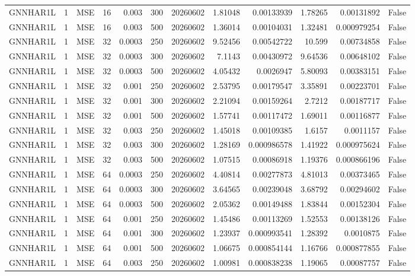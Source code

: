 \begin{tabular}{lrlrrrrrrrrr}
GNNHAR1L & 1 & MSE & 16 & 0.003 & 300 & 20260602 & 1.81048 & 0.00133939 & 1.78265 & 0.00131892 & False \\
GNNHAR1L & 1 & MSE & 16 & 0.003 & 500 & 20260602 & 1.36014 & 0.00104031 & 1.32481 & 0.000979254 & False \\
GNNHAR1L & 1 & MSE & 32 & 0.0003 & 250 & 20260602 & 9.52456 & 0.00542722 & 10.599 & 0.00734858 & False \\
GNNHAR1L & 1 & MSE & 32 & 0.0003 & 300 & 20260602 & 7.1143 & 0.00430972 & 9.64536 & 0.00648102 & False \\
GNNHAR1L & 1 & MSE & 32 & 0.0003 & 500 & 20260602 & 4.05432 & 0.0026947 & 5.80093 & 0.00383151 & False \\
GNNHAR1L & 1 & MSE & 32 & 0.001 & 250 & 20260602 & 2.53795 & 0.00179547 & 3.35891 & 0.00223701 & False \\
GNNHAR1L & 1 & MSE & 32 & 0.001 & 300 & 20260602 & 2.21094 & 0.00159264 & 2.7212 & 0.00187717 & False \\
GNNHAR1L & 1 & MSE & 32 & 0.001 & 500 & 20260602 & 1.57741 & 0.00117472 & 1.69011 & 0.00116877 & False \\
GNNHAR1L & 1 & MSE & 32 & 0.003 & 250 & 20260602 & 1.45018 & 0.00109385 & 1.6157 & 0.0011157 & False \\
GNNHAR1L & 1 & MSE & 32 & 0.003 & 300 & 20260602 & 1.28169 & 0.000986578 & 1.41922 & 0.000975624 & False \\
GNNHAR1L & 1 & MSE & 32 & 0.003 & 500 & 20260602 & 1.07515 & 0.00086918 & 1.19376 & 0.000866196 & False \\
GNNHAR1L & 1 & MSE & 64 & 0.0003 & 250 & 20260602 & 4.40814 & 0.00277873 & 4.81013 & 0.00373465 & False \\
GNNHAR1L & 1 & MSE & 64 & 0.0003 & 300 & 20260602 & 3.64565 & 0.00239048 & 3.68792 & 0.00294602 & False \\
GNNHAR1L & 1 & MSE & 64 & 0.0003 & 500 & 20260602 & 2.05362 & 0.00149488 & 1.83844 & 0.00152304 & False \\
GNNHAR1L & 1 & MSE & 64 & 0.001 & 250 & 20260602 & 1.45486 & 0.00113269 & 1.52553 & 0.00138126 & False \\
GNNHAR1L & 1 & MSE & 64 & 0.001 & 300 & 20260602 & 1.23937 & 0.000993541 & 1.28392 & 0.0010875 & False \\
GNNHAR1L & 1 & MSE & 64 & 0.001 & 500 & 20260602 & 1.06675 & 0.000854144 & 1.16766 & 0.000877855 & False \\
GNNHAR1L & 1 & MSE & 64 & 0.003 & 250 & 20260602 & 1.00981 & 0.000838238 & 1.19065 & 0.00087757 & False \\

\end{tabular}
